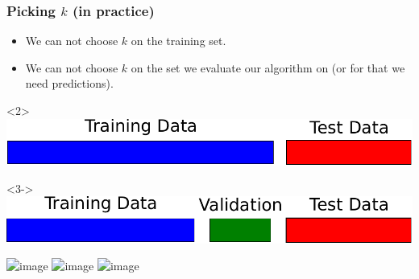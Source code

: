 \begin{frame}[t]
    \frametitle{Picking $k$ (in practice)}
    \begin{itemize}
        \item We can not choose $k$ on the training set.
        \item We can not choose $k$ on the set we evaluate our algorithm on (or
            for that we need predictions).
    \end{itemize}
    \center
        \begin{onlyenv}<2>
            \includegraphics[width=.7\linewidth]{knn-pics/train_test_bars-crop}\\
        \end{onlyenv}
        \begin{onlyenv}<3->
            \includegraphics[width=.7\linewidth]{knn-pics/train_val_test_bars-crop}\\
        \end{onlyenv}

    \includegraphics<4>[width=.7\linewidth]{knn-pics/two_moons_cross_validation_1}
    \includegraphics<5>[width=.7\linewidth]{knn-pics/two_moons_cross_validation_2}
    \includegraphics<6>[width=.7\linewidth]{knn-pics/two_moons_cross_validation_3}

\end{frame}

